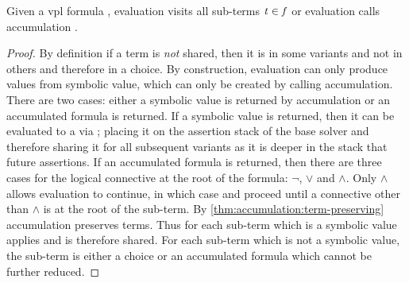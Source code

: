 \begin{lemma}
  \label{lemma:ev:all-terms}
  Given a \ac{vpl} formula \fV{}, evaluation visits all sub-terms $\mathit{t}{} \in
  \mathit{f}{}$ or evaluation calls accumulation .
\end{lemma}
%
\begin{proof}
  By definition if a term is \emph{not} shared, then it is in some variants and
  not in others and therefore in a choice. By construction, evaluation can only
  produce \unit{} values from symbolic value, which can only be created by
  calling accumulation. There are two cases: either a symbolic value is returned
  by accumulation or an accumulated formula is returned. If a symbolic value is
  returned, then it can be evaluated to a \unit{} via \evSym{}; placing it on
  the assertion stack of the base solver and therefore sharing it for all
  subsequent variants as it is deeper in the stack that future assertions. If an
  accumulated formula is returned, then there are three cases for the logical
  connective at the root of the formula: $\neg$, $\vee$ and $\wedge$. Only
  $\wedge$ allows evaluation to continue, in which case \evSym{} and \evAnd{}
  proceed until a connective other than $\wedge$ is at the root of the sub-term.
  By \autoref{thm:accumulation:term-preserving} accumulation preserves terms.
  Thus for each sub-term which is a symbolic value \evSym{} applies and is
  therefore shared. For each sub-term which is not a symbolic value, the
  sub-term is either a choice or an accumulated formula which cannot be further
  reduced.
\end{proof}


